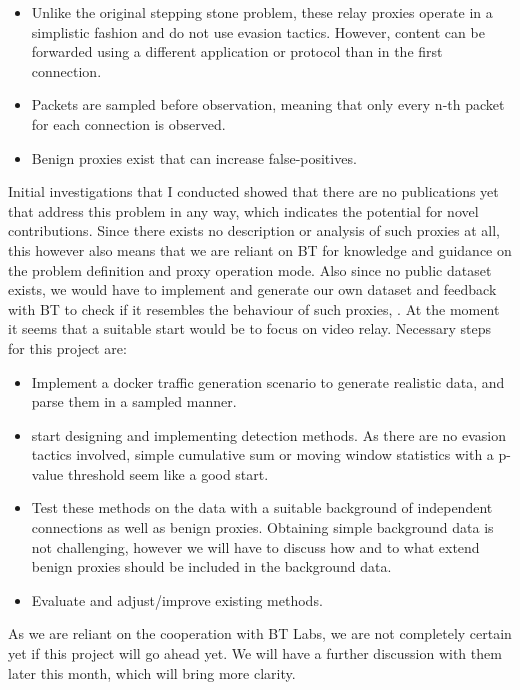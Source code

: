 \documentclass[a4paper,12pt,twoside]{article}
\begin{document}
\begin{itemize}
\item Unlike the original stepping stone problem, these relay proxies operate in a simplistic fashion and do not use evasion tactics. However, content can be forwarded using a different application or protocol than in the first connection.
\item Packets are sampled before observation, meaning that only every n-th packet for each connection is observed.
\item Benign proxies exist that can increase false-positives.
\end{itemize}

Initial investigations that I conducted showed that there are no publications yet that address this problem in any way, which indicates the potential for novel contributions. Since there exists no description or analysis of such proxies at all, this however also means that we are reliant on BT for knowledge and guidance on the problem definition and proxy operation mode. Also since no public dataset exists, we would have to implement and generate our own dataset and feedback with BT to check if it resembles the behaviour of such proxies, . At the moment it seems that a suitable start would be to focus on video relay. Necessary steps for this project are:

\begin{itemize}

\item Implement a docker traffic generation scenario to generate realistic data, and parse them in a sampled manner.
\item start designing and implementing detection methods. As there are no evasion tactics involved, simple cumulative sum or moving window statistics with a p-value threshold seem like a good start.
\item Test these methods on the data with a suitable background of independent connections as well as benign proxies. Obtaining simple background data is not challenging, however we will have to discuss how and to what extend benign proxies should be included in the background data.
\item Evaluate and adjust/improve existing methods.

\end{itemize}

As we are reliant on the cooperation with BT Labs, we are not completely certain yet if this project will go ahead yet. We will have a further discussion with them later this month, which will bring more clarity. 
\end{document}
